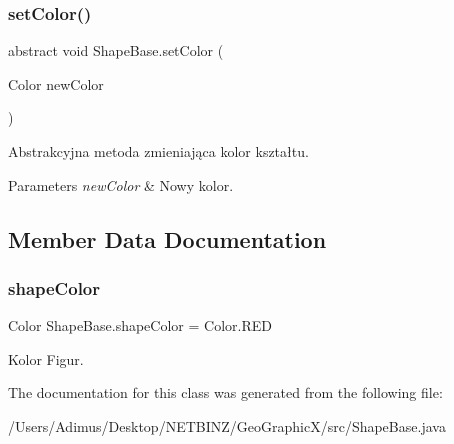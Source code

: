 \subsubsection{set\+Color()}
{\footnotesize\ttfamily abstract void Shape\+Base.\+set\+Color (\begin{DoxyParamCaption}\item[{Color}]{new\+Color }\end{DoxyParamCaption})\hspace{0.3cm}{\ttfamily [abstract]}}

Abstrakcyjna metoda zmieniająca kolor kształtu. 
\begin{DoxyParams}{Parameters}
{\em new\+Color} & Nowy kolor. \\
\hline
\end{DoxyParams}


\subsection{Member Data Documentation}
\mbox{\label{class_shape_base_aaf94f09219195ef803a3c6d2b67eca8e}} 
\subsubsection{shape\+Color}
{\footnotesize\ttfamily Color Shape\+Base.\+shape\+Color = Color.\+R\+ED\hspace{0.3cm}{\ttfamily [protected]}}

Kolor Figur. 

The documentation for this class was generated from the following file\+:\begin{DoxyCompactItemize}
\item 
/\+Users/\+Adimus/\+Desktop/\+N\+E\+T\+B\+I\+N\+Z/\+Geo\+Graphic\+X/src/Shape\+Base.\+java\end{DoxyCompactItemize}
